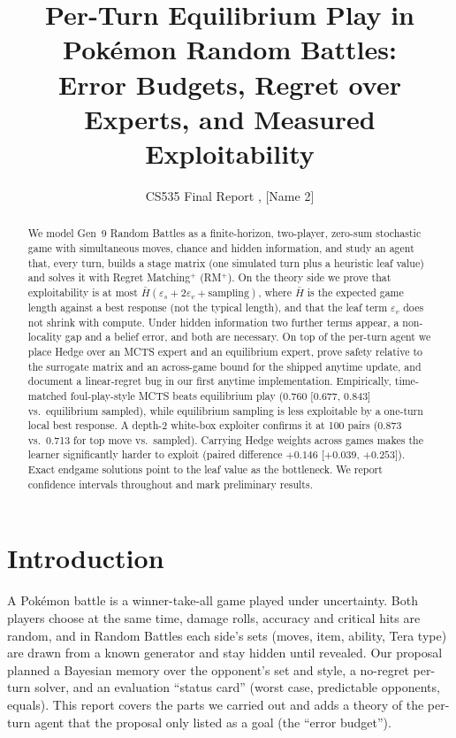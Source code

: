\documentclass[10pt]{article}
\title{\vspace{-2.4em}\textbf{Per-Turn Equilibrium Play in Pok\'emon Random Battles:\\Error Budgets, Regret over Experts, and Measured Exploitability}\vspace{-0.8em}}
\author{CS535 Final Report \quad [Name 1], [Name 2]}
\date{\vspace{-1.6em}}
\theoremstyle{plain}
\theoremstyle{definition}
\theoremstyle{remark}
\newcommand{\Hbar}{\bar H}
\newcommand{\epss}{\varepsilon_s}
\newcommand{\epsv}{\varepsilon_v}
\begin{document}
\maketitle

\begin{abstract}
\noindent
We model Gen~9 Random Battles as a finite-horizon, two-player, zero-sum stochastic game with simultaneous moves, chance and hidden information, and study an agent that, every turn, builds a stage matrix (one simulated turn plus a heuristic leaf value) and solves it with Regret Matching$^+$ (RM$^+$). On the theory side we prove that exploitability is at most $\Hbar(\epss+2\epsv+\text{sampling})$, where $\Hbar$ is the expected game length against a best response (not the typical length), and that the leaf term $\epsv$ does not shrink with compute. Under hidden information two further terms appear, a non-locality gap and a belief error, and both are necessary. On top of the per-turn agent we place Hedge over an MCTS expert and an equilibrium expert, prove safety relative to the surrogate matrix and an across-game bound for the shipped anytime update, and document a linear-regret bug in our first anytime implementation. Empirically, time-matched foul-play-style MCTS beats equilibrium play (0.760 [0.677, 0.843] vs.\ equilibrium sampled), while equilibrium sampling is less exploitable by a one-turn local best response. A depth-2 white-box exploiter confirms it at 100 pairs (0.873 vs.\ 0.713 for top move vs.\ sampled). Carrying Hedge weights across games makes the learner significantly harder to exploit (paired difference $+0.146$ [$+0.039$, $+0.253$]). Exact endgame solutions point to the leaf value as the bottleneck. We report confidence intervals throughout and mark preliminary results.
\end{abstract}

\section{Introduction}
\label{sec:intro}
A Pok\'emon battle is a winner-take-all game played under uncertainty. Both players choose at the same time, damage rolls, accuracy and critical hits are random, and in Random Battles each side's sets (moves, item, ability, Tera type) are drawn from a known generator and stay hidden until revealed. Our proposal planned a Bayesian memory over the opponent's set and style, a no-regret per-turn solver, and an evaluation ``status card'' (worst case, predictable opponents, equals). This report covers the parts we carried out and adds a theory of the per-turn agent that the proposal only listed as a goal (the ``error budget'').
\end{document}
